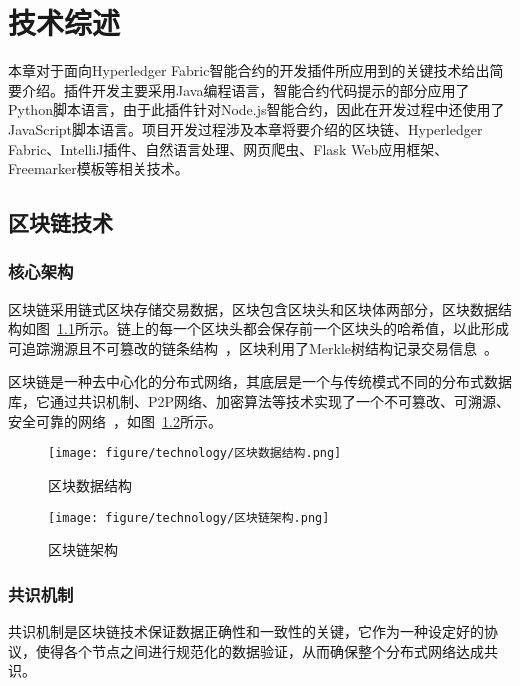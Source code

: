 \chapter{技术综述}

本章对于面向Hyperledger Fabric智能合约的开发插件所应用到的关键技术给出简要介绍。插件开发主要采用Java编程语言，智能合约代码提示的部分应用了Python脚本语言，由于此插件针对Node.js智能合约，因此在开发过程中还使用了JavaScript脚本语言。项目开发过程涉及本章将要介绍的区块链、Hyperledger Fabric、IntelliJ插件、自然语言处理、网页爬虫、Flask Web应用框架、Freemarker模板等相关技术。

\section{区块链技术}

\subsection{核心架构}

区块链采用链式区块存储交易数据，区块包含区块头和区块体两部分，区块数据结构如图~\ref{fig:2.1}所示。链上的每一个区块头都会保存前一个区块头的哈希值，以此形成可追踪溯源且不可篡改的链条结构~\cite{Bitcoin}，区块利用了Merkle树结构记录交易信息~\cite{DBLP:reference/db/Carminati18b}。

区块链是一种去中心化的分布式网络，其底层是一个与传统模式不同的分布式数据库，它通过共识机制、P2P网络、加密算法等技术实现了一个不可篡改、可溯源、安全可靠的网络~\cite{XiliangWang}，如图~\ref{fig:2.2}所示。

\begin{figure}[htb]
  \centering
  \texttt{[image: figure/technology/区块数据结构.png]}
  \caption{区块数据结构}\label{fig:2.1}
\end{figure}

\begin{figure}[htb]
  \centering
  \texttt{[image: figure/technology/区块链架构.png]}
  \caption{区块链架构}\label{fig:2.2}
\end{figure}

\subsection{共识机制}

共识机制是区块链技术保证数据正确性和一致性的关键，它作为一种设定好的协议，使得各个节点之间进行规范化的数据验证，从而确保整个分布式网络达成共识。

